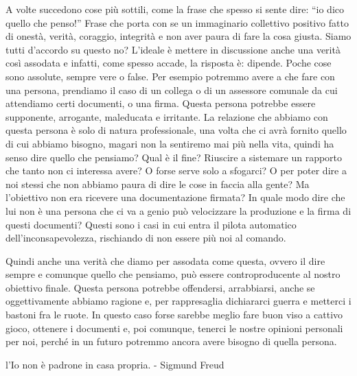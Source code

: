 \documentclass[12pt]{book} %
\begin{document}
A volte succedono cose più sottili, come la frase che spesso si sente dire: “io dico quello che penso!” Frase che porta
con se un immaginario collettivo positivo fatto di onestà, verità, coraggio, integrità e non aver paura di fare la cosa
giusta. Siamo tutti d'accordo su questo no? L'ideale è mettere in discussione
anche una verità così assodata e infatti, come spesso accade, la risposta è: dipende. Poche cose sono assolute, sempre
vere o false. Per esempio potremmo avere a che fare con una persona, prendiamo il caso di un collega o di un assessore
comunale da cui attendiamo certi documenti, o una firma. Questa persona potrebbe essere supponente, arrogante,
maleducata e irritante. La relazione che abbiamo con questa persona è solo di natura professionale, una volta che ci
avrà fornito quello di cui abbiamo bisogno, magari non la sentiremo mai più nella vita, quindi ha senso dire quello che
pensiamo? Qual è il fine? Riuscire a sistemare un rapporto che tanto non ci interessa avere? O forse serve solo a
sfogarci? O per poter dire a noi stessi che non abbiamo paura di dire le cose in faccia alla gente? Ma
l'obiettivo non era ricevere una documentazione firmata? In quale modo dire che lui non è una
persona che ci va a genio può velocizzare la produzione e la firma di questi documenti? Questi sono i casi in cui entra
il pilota automatico dell'inconsapevolezza, rischiando di non essere più noi al comando.

Quindi anche una verità che diamo per assodata come questa, ovvero il dire sempre e comunque quello che pensiamo, può
essere controproducente al nostro obiettivo finale. Questa persona potrebbe offendersi, arrabbiarsi, anche se
oggettivamente abbiamo ragione e, per rappresaglia dichiararci guerra e metterci i bastoni fra le ruote. In questo caso
forse sarebbe meglio fare buon viso a cattivo gioco, ottenere i documenti e, poi comunque, tenerci le nostre opinioni
personali per noi, perché in un futuro potremmo ancora avere bisogno di quella persona.

l'Io non è padrone in casa propria. - Sigmund Freud
\end{document}
